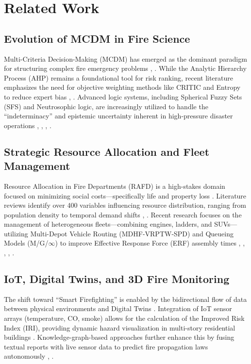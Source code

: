 \section{Related Work}
\label{sec:related-work}

\subsection{Evolution of MCDM in Fire Science}
Multi-Criteria Decision-Making (MCDM) has emerged as the dominant paradigm for structuring complex fire emergency problems 
\cite{math13050731}, \cite{GrandaChico2025}. 
While the Analytic Hierarchy Process (AHP) remains a foundational tool for risk ranking, 
recent literature emphasizes the need for objective weighting methods like CRITIC and Entropy to reduce expert bias 
\cite{Patel2025}, \cite{Singh2023} \cite{math13050731}. 
Advanced logic systems, including Spherical Fuzzy Sets (SFS) and Neutrosophic logic, 
are increasingly utilized to handle the ``indeterminacy'' and epistemic uncertainty inherent in high-pressure disaster operations 
\cite{SphericalFuzzy_2023}, \cite{Neutrosophic_PERT_2025}, \cite{Doe2024}, \cite{Lee2025}.

\subsection{Strategic Resource Allocation and Fleet Management}
Resource Allocation in Fire Departments (RAFD) is a high-stakes domain focused on minimizing social costs—specifically life and property loss 
\cite{Eslamzadeh2022}. 
Literature reviews identify over 400 variables influencing resource distribution, ranging from population density to temporal demand shifts 
\cite{Eslamzadeh2022}, \cite{Garcia2024}. 
Recent research focuses on the management of heterogeneous fleets—combining engines, ladders, 
and SUVs—utilizing Multi-Depot Vehicle Routing (MDHF-VRPTW-SPD) and Queueing Models (M/G/$\infty$) to improve Effective Response Force (ERF) 
assembly times \cite{Brown2025}, \cite{Taylor2023}, \cite{Zhou2025}, \cite{Davis2026}, \cite{Kim2025}.

\subsection{IoT, Digital Twins, and 3D Fire Monitoring}
The shift toward ``Smart Firefighting'' is enabled by the bidirectional flow of data between physical environments and Digital Twins 
\cite{Smith2025}. Integration of IoT sensor arrays (temperature, CO, smoke) allows for the calculation of the Improved Risk Index (IRI), 
providing dynamic hazard visualization in multi-story residential buildings \cite{Abdullahi2025}. 
Knowledge-graph-based approaches further enhance this by fusing textual reports with live sensor data to
predict fire propagation laws autonomously \cite{Smith2025}, \cite{NIST2026}.

